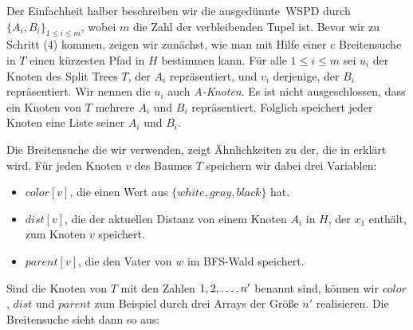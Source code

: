 \documentclass[11pt]{article}
\begin{document}
    Der Einfachheit halber beschreiben wir die \glqq ausgedünnte\grqq\ WSPD durch $\{A_i, B_i\}_{1\leq i \leq m}$, wobei $m$ die Zahl der verbleibenden Tupel ist.
    Bevor wir zu Schritt (4) kommen, zeigen wir zunächst, wie man mit Hilfe einer c Breitensuche in $T$ einen kürzesten Pfad in $H$ bestimmen kann.  
    Für alle $1 \leq i \leq m$ sei $u_i$ der Knoten des Split Trees $T$, der $A_i$ repräsentiert, und $v_i$ derjenige, der $B_i$ repräsentiert. Wir nennen die $u_i$ auch \emph{A-Knoten}. Es ist nicht ausgeschlossen, dass ein Knoten von $T$ mehrere $A_i$ und $B_i$ repräsentiert. Folglich speichert jeder Knoten eine Liste seiner $A_i$ und $B_i$.
    
    Die Breitensuche die wir verwenden, zeigt Ähnlichkeiten zu der, die in \cite{hagerup} erklärt wird. Für jeden Knoten $v$ des Baumes $T$ speichern wir dabei drei Variablen:
    \begin{itemize}
    	\item $color[v]$, die einen Wert aus $\{white, gray, black\}$ hat.
    	\item $dist[v]$, die der aktuellen Distanz von einem Knoten $A_i$ in $H$, der $x_1$ enthält, zum Knoten $v$ speichert.
    	\item $parent[v]$, die den Vater von $w$ im BFS-Wald speichert.
    \end{itemize}
    Sind die Knoten von $T$ mit den Zahlen $1, 2,\mathellipsis, n'$ benannt sind, können wir $color$, $dist$ und $parent$ zum Beispiel durch drei Arrays der Größe $n'$ realisieren.
    Die Breitensuche sieht dann so aus:
    
\end{document}
